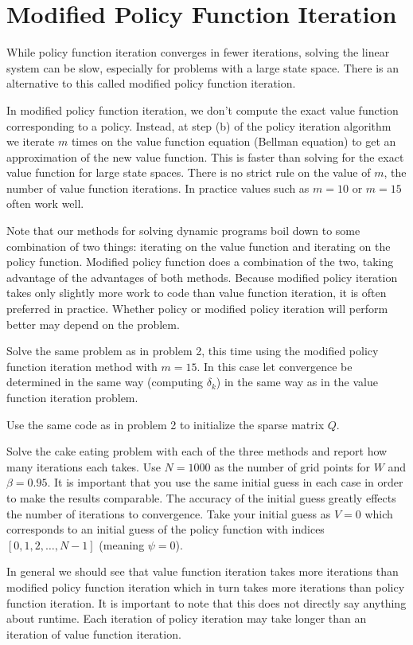\section*{Modified Policy Function Iteration}

While policy function iteration converges in fewer iterations, solving the linear system can be slow, especially for problems with a large state space.  There is an alternative to this called modified policy function iteration.

In modified policy function iteration, we don't compute the exact value function corresponding to a policy.  Instead, at step (b) of the policy iteration algorithm we iterate $m$ times on the value function equation (Bellman equation) to get an approximation of the new value function.  This is faster than solving for the exact value function for large state spaces.  There is no strict rule on the value of $m$, the number of value function iterations.  In practice values such as $m=10$ or $m=15$ often work well.

Note that our methods for solving dynamic programs boil down to some combination of two things: iterating on the value function and iterating on the policy function.  Modified policy function does a combination of the two, taking advantage of the advantages of both methods.  Because modified policy iteration takes only slightly more work to code than value function iteration, it is often preferred in practice.  Whether policy or modified policy iteration will perform better may depend on the problem.

\begin{problem}
Solve the same problem as in problem 2, this time using the modified policy function iteration method with $m=15$.  In this case let convergence be determined in the same way (computing $\delta_k$) in the same way as in the value function iteration problem.

Use the same code as in problem 2 to initialize the sparse matrix $Q$.
\end{problem}

\begin{problem}
Solve the cake eating problem with each of the three methods and report how many iterations each takes.  Use $N= 1000$ as the number of grid points for $W$ and $\beta = 0.95$.  It is important that you use the same initial guess in each case in order to make the results comparable.  The accuracy of the initial guess greatly effects the number of iterations to convergence.  Take your initial guess as $V = 0$ which corresponds to an initial guess of the policy function with indices $[0,1,2,\ldots, N-1]$ (meaning $\psi = 0$).
\end{problem}

In general we should see that value function iteration takes more iterations than modified policy function iteration which in turn takes more iterations than policy function iteration.  It is important to note that this does not directly say anything about runtime.  Each iteration of policy iteration may take longer than an iteration of value function iteration.

